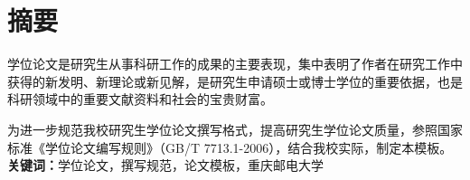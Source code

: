 


\chapter{摘\quad 要}
\xiaosi

学位论文是研究生从事科研工作的成果的主要表现，集中表明了作者在研究工作中获得的新发明、新理论或新见解，是研究生申请硕士或博士学位的重要依据，也是科研领域中的重要文献资料和社会的宝贵财富。

为进一步规范我校研究生学位论文撰写格式，提高研究生学位论文质量，参照国家标准《学位论文编写规则》（GB/T 7713.1-2006），结合我校实际，制定本模板。
\\
  
\noindent\songti\textbf{关键词：}学位论文，撰写规范，论文模板，重庆邮电大学

\clearpage